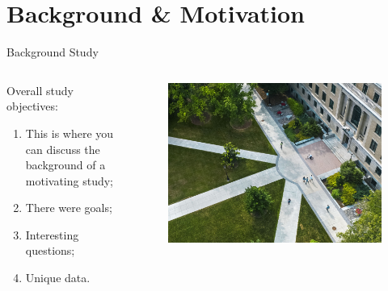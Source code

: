 \documentclass[usenames,dvipsnames]{beamer}
\begin{document}
\section{Background \& Motivation}

\begin{frame}{Background Study}
    \begin{columns}
       \begin{column}{0.5\textwidth}\centering
            Overall study objectives:
            \begin{enumerate}\tiny
                \item This is where you can discuss the background of a motivating study;
                \item There were goals;
                \item Interesting questions;
                \item Unique data.
            \end{enumerate}
       \end{column} 
       \begin{column}{0.5\textwidth}
            \begin{figure}
                \raggedright
                \includegraphics[width=.9\linewidth]{Images/carousel-01.jpg}
            \end{figure}       
        \end{column} 
    \end{columns}
\end{frame}
\end{document}
